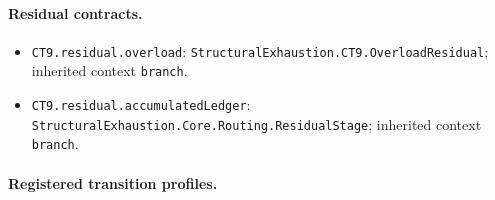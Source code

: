 \begingroup\small\sloppy
\paragraph{Residual contracts.}
\begin{itemize}
\item \texttt{CT9.\allowbreak{}residual.\allowbreak{}overload}: \texttt{Structural\allowbreak{}Exhaustion.\allowbreak{}CT9.\allowbreak{}Overload\allowbreak{}Residual}; inherited context \texttt{branch}.
\item \texttt{CT9.\allowbreak{}residual.\allowbreak{}accumulated\allowbreak{}Ledger}: \texttt{Structural\allowbreak{}Exhaustion.\allowbreak{}Core.\allowbreak{}Routing.\allowbreak{}Residual\allowbreak{}Stage}; inherited context \texttt{branch}.
\end{itemize}
\paragraph{Registered transition profiles.}

